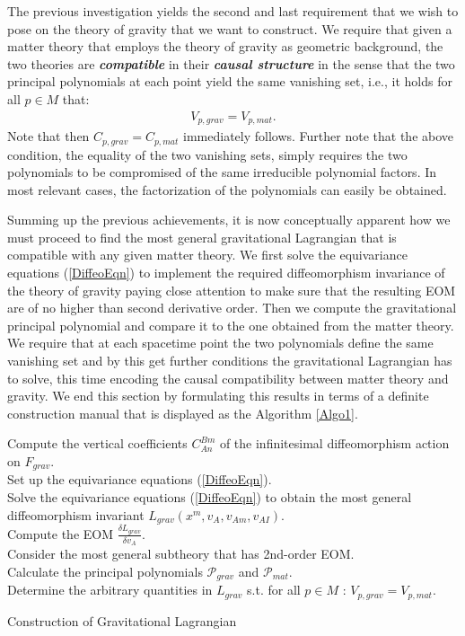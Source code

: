 The previous investigation yields the second and last requirement that we wish to pose on the theory of gravity that we want to construct. We require that given a matter theory that employs the theory of gravity as geometric background, the two theories are \textit{\textbf{compatible}} in their \textit{\textbf{causal structure}} in the sense that the two principal polynomials at each point yield the same vanishing set, i.e., it holds for all $p \in M$ that: 
\begin{align}
    V_{p,grav} = V_{p,mat}.
\end{align}
Note that then $C_{p,grav} = C_{p,mat}$ immediately follows. Further note that the above condition, the equality of the two vanishing sets, simply requires the two polynomials to be compromised of the same irreducible polynomial factors. In most relevant cases, the factorization of the polynomials can easily be obtained.


Summing up the previous achievements, it is now conceptually apparent how we must proceed to find the most general gravitational Lagrangian that is compatible with any given matter theory. We first solve the equivariance equations (\ref{DiffeoEqn}) to implement the required diffeomorphism invariance of the theory of gravity paying close attention to make sure that the resulting EOM are of no higher than second derivative order. Then we compute the gravitational principal polynomial and compare it to the one obtained from the matter theory. We require that at each spacetime point the two polynomials define the same vanishing set and by this get further conditions the gravitational Lagrangian has to solve, this time encoding the causal compatibility between matter theory and gravity.
We end this section by formulating this results in terms of a definite construction manual that is displayed as the Algorithm \ref{Algo1}.
\begin{algorithm}[hbt!]
\SetAlgoLined
{}
Compute the vertical coefficients $C^{Bm}_{An}$ of the infinitesimal diffeomorphism action on $F_{grav}$. \\
Set up the equivariance equations (\ref{DiffeoEqn}). \\
Solve the equivariance equations (\ref{DiffeoEqn}) to obtain the most general diffeomorphism invariant $L_{grav}(x^m,v_A,v_{Am},v_{AI})$.\\
Compute the EOM $\frac{\delta L_{grav}}{\delta v_A}$.\\
Consider the most general subtheory that has 2nd-order EOM.\\
Calculate the principal polynomials $\mathcal{P}_{grav}$ and $\mathcal{P}_{mat}$.\\
Determine the arbitrary quantities in $L_{grav}$ s.t. for all $p \in M$ : $V_{p,grav} = V_{p,mat}.$
 \caption{Construction of Gravitational Lagrangian}\label{Algo1}
\end{algorithm}


